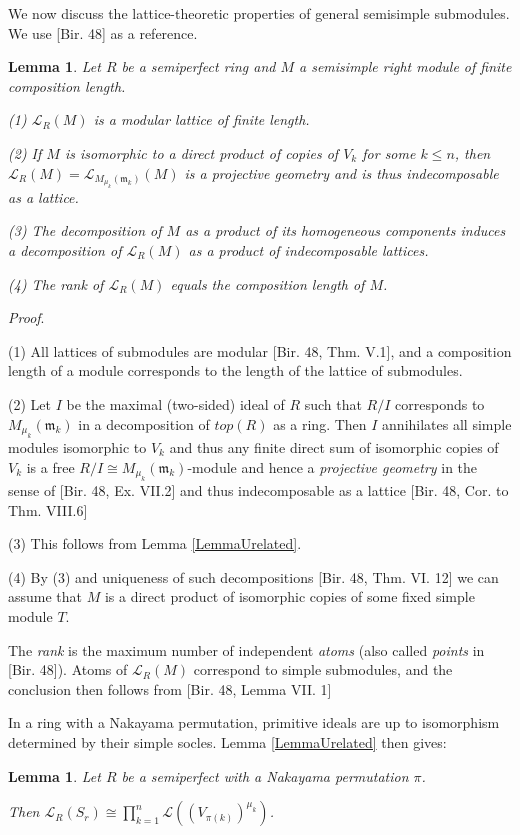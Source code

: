 \documentclass[11pt]{article}
\theoremstyle{plain}
\newtheorem{Lemma}[veta]{Lemma}
\theoremstyle{remark}
\theoremstyle{plain}
\newenvironment{Proof}{
  \par\medskip\noindent
  \textit{Proof}.
}{
\newline
\rightline{$\qedsymbol$}
}
\newcommand{\m}{\mathfrak{m}}
\begin{document}
We now discuss the lattice-theoretic properties of general semisimple submodules. We use [Bir. 48] as a reference.  
\begin{Lemma}\label{LemmaBir} Let $R$ be a semiperfect ring and $M$ a semisimple right module of finite composition length.

(1) $\mathcal{L}_R(M)$ is a modular lattice of finite length. 

(2) If $M$ is isomorphic to a direct product of copies of $V_k$ for some $k\leq n$, then $\mathcal{L}_R(M)=\mathcal{L}_{M_{\mu_k}(\m_k)}(M)$ is a projective geometry and is thus indecomposable as a lattice.

(3) The decomposition of $M$ as a product of its homogeneous components induces a decomposition of $\mathcal{L}_R(M)$ as a product of indecomposable lattices.

(4) The rank of  $\mathcal{L}_R(M)$ equals the composition length of $M$.
\end{Lemma}
\begin{Proof}
    (1) All lattices of submodules are modular [Bir. 48, Thm. V.1], and a composition length of a module corresponds to the length of the lattice of submodules.

     (2) Let $I$ be the maximal (two-sided) ideal of $R$ such that $R/I$ corresponds to $M_{\mu_k}(\m_k)$ in a decomposition of $top(R)$ as a ring. Then $I$ annihilates all simple modules isomorphic to $V_k$ and thus any finite direct sum of isomorphic copies of $V_k$ is a free $R/I\cong M_{\mu_k}(\m_k)$-module and hence a \textit{projective geometry} in the sense of [Bir. 48, Ex. VII.2] and thus indecomposable as a lattice [Bir. 48, Cor. to Thm. VIII.6]

     (3) This follows from Lemma \ref{LemmaUrelated}.

     (4) By (3) and uniqueness of such decompositions [Bir. 48, Thm. VI. 12] we can assume that $M$ is a direct product of isomorphic copies of some fixed simple module $T$. 
     
     The \textit{rank} is the maximum number of independent \textit{atoms} (also called \textit{points} in [Bir. 48]). Atoms of $\mathcal{L}_R(M)$ correspond to simple submodules, and the conclusion then follows from [Bir. 48, Lemma VII. 1]
\end{Proof}
In a ring with a Nakayama permutation, primitive ideals are up to isomorphism determined by their simple socles. Lemma \ref{LemmaUrelated} then gives:
\begin{Lemma}\label{LemmaSocleStruct}
Let $R$ be a semiperfect with a Nakayama permutation $\pi$.

Then $\mathcal{L}_R(S_r)\cong \prod_{k=1}^n \mathcal{L}((V_{\pi(k)})^{\mu_{k}})$. 
\end{Lemma}
\end{document}
